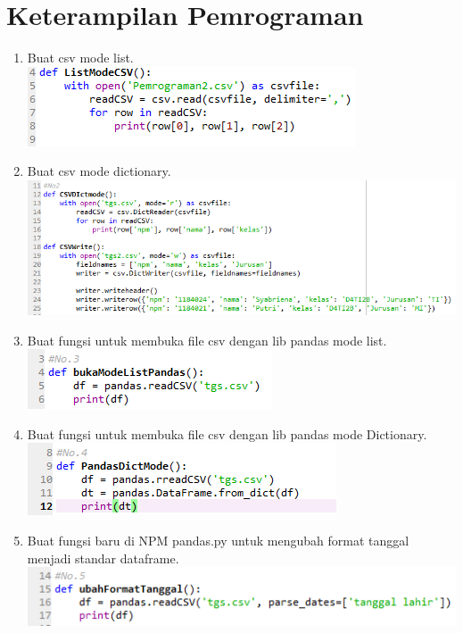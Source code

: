 \section{Keterampilan Pemrograman}
\begin{enumerate}
\item Buat csv mode list.\\ 
\includegraphics{gambar/csv7.png}
\item Buat csv mode dictionary.\\ 
\includegraphics[scale = 0.7]{gambar/csv8.png}
\item Buat fungsi untuk membuka file csv dengan lib pandas mode list.\\
\includegraphics{gambar/csv9.png}
\item Buat fungsi untuk membuka file csv dengan lib pandas mode Dictionary.\\ 
\includegraphics{gambar/csv10.png}
\item Buat fungsi baru di NPM pandas.py untuk mengubah format tanggal menjadi standar dataframe.\\ 
\includegraphics{gambar/csv11.png}

\end{enumerate}
